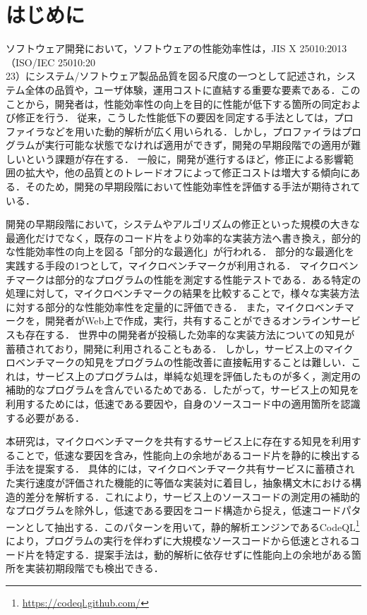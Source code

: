 \documentclass[11pt]{jreport}
\begin{document}

\chapter{はじめに}

ソフトウェア開発において，ソフトウェアの性能効率性は，JIS X 25010:2013（ISO/IEC 25010:20\\23）にシステム/ソフトウェア製品品質を図る尺度の一つとして記述され\cite{JISX25010, ISO25010}，システム全体の品質や，ユーザ体験，運用コストに直結する重要な要素である\cite{performance1, performance2, negative}．このことから，開発者は，性能効率性の向上を目的に性能が低下する箇所の同定および修正を行う．
従来，こうした性能低下の要因を同定する手法としては，プロファイラなどを用いた動的解析が広く用いられる．しかし，プロファイラはプログラムが実行可能な状態でなければ適用ができず，開発の早期段階での適用が難しいという課題が存在する．
一般に，開発が進行するほど，修正による影響範囲の拡大や，他の品質とのトレードオフによって修正コストは増大する傾向にある\cite{local2system}．そのため，開発の早期段階において性能効率性を評価する手法が期待されている\cite{assessment_JMbenchmark}．

開発の早期段階において，システムやアルゴリズムの修正といった規模の大きな最適化だけでなく，既存のコード片をより効率的な実装方法へ書き換え，部分的な性能効率性の向上を図る「部分的な最適化」が行われる\cite{jsRefac, performance_aware_code_changes, JITProf, DrAsync}．
部分的な最適化を実践する手段の1つとして，マイクロベンチマークが利用される\cite{performance_aware}．
マイクロベンチマークは部分的なプログラムの性能を測定する性能テストである．ある特定の処理に対して，マイクロベンチマークの結果を比較することで，様々な実装方法に対する部分的な性能効率性を定量的に評価できる．
また，マイクロベンチマークを，開発者がWeb上で作成，実行，共有することができるオンラインサービスも存在する．
世界中の開発者が投稿した効率的な実装方法についての知見が蓄積されており，開発に利用されることもある．
しかし，サービス上のマイクロベンチマークの知見をプログラムの性能改善に直接転用することは難しい．これは，サービス上のプログラムは，単純な処理を評価したものが多く，測定用の補助的なプログラムを含んでいるためである．したがって，サービス上の知見を利用するためには，低速である要因や，自身のソースコード中の適用箇所を認識する必要がある．

本研究は，マイクロベンチマークを共有するサービス上に存在する知見を利用することで，低速な要因を含み，性能向上の余地があるコード片を静的に検出する手法を提案する．
具体的には，マイクロベンチマーク共有サービスに蓄積された実行速度が評価された機能的に等価な実装対に着目し，抽象構文木における構造的差分を解析する．これにより，サービス上のソースコードの測定用の補助的なプログラムを除外し，低速である要因をコード構造から捉え，低速コードパターンとして抽出する．このパターンを用いて，静的解析エンジンであるCodeQL\footnote{\url{https://codeql.github.com/}}\cite{ql}により，プログラムの実行を伴わずに大規模なソースコードから低速とされるコード片を特定する．提案手法は，動的解析に依存せずに性能向上の余地がある箇所を実装初期段階でも検出できる．
\end{document}
